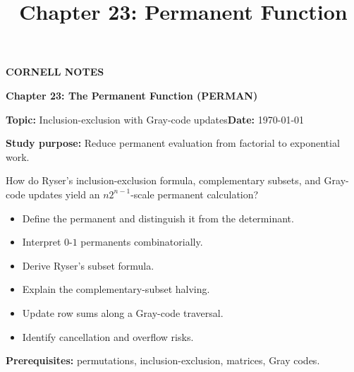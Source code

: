 \documentclass[10pt,letterpaper]{article}
\title{Chapter 23: Permanent Function}
\author{}
\date{}
\begin{document}
\maketitle
\begin{tcolorbox}[colback=Paper,colframe=Ink]{\small\bfseries\color{Teal}CORNELL NOTES}\par{\LARGE\bfseries Chapter 23: The Permanent Function (PERMAN)}\par\medskip\textbf{Topic:} Inclusion-exclusion with Gray-code updates\hfill\textbf{Date:} \today\par\textbf{Study purpose:} Reduce permanent evaluation from factorial to exponential work.\end{tcolorbox}
\begin{tcolorbox}[colback=Teal!5,colframe=Teal,title=Essential question]How do Ryser's inclusion-exclusion formula, complementary subsets, and Gray-code updates yield an $n2^{n-1}$-scale permanent calculation?\end{tcolorbox}
\begin{tcolorbox}[colback=white,colframe=Mist,title=Learning objectives]\begin{itemize}\item Define the permanent and distinguish it from the determinant.\item Interpret $0$-$1$ permanents combinatorially.\item Derive Ryser's subset formula.\item Explain the complementary-subset halving.\item Update row sums along a Gray-code traversal.\item Identify cancellation and overflow risks.\end{itemize}\textbf{Prerequisites:} permutations, inclusion-exclusion, matrices, Gray codes.\end{tcolorbox}
\end{document}
